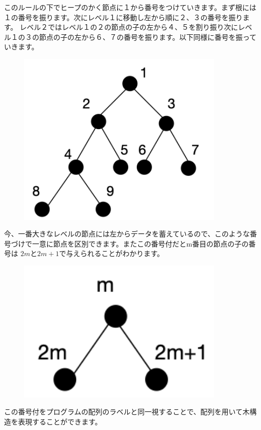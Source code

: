 \documentclass[dvipdfmx,pic,eepic,ecltree]{jarticle}
\begin{document}
このルールの下でヒープのかく節点に１から番号をつけていきます。まず根には１の番号を振ります。次にレベル１に移動し左から順に２、３の番号を振ります。
レベル２ではレベル１の２の節点の子の左から４、５を割り振り次にレベル１の３の節点の子の左から６、７の番号を振ります。以下同様に番号を振っていきます。
 \begin{figure}[H]
 \begin{center}
\includegraphics[width=100mm]{heap_number.png}
\end{center}
\end{figure}
今、一番大きなレベルの節点には左からデータを蓄えているので、このような番号づけで一意に節点を区別できます。またこの番号付だとm番目の節点の子の番号は
$2m$と$2m+1$で与えられることがわかります。
 \begin{figure}[H]
 \begin{center}
\includegraphics[width=100mm]{heap_number2.png}
\end{center}
\end{figure}
この番号付をプログラムの配列のラベルと同一視することで、配列を用いて木構造を表現することができます。
\end{document}
